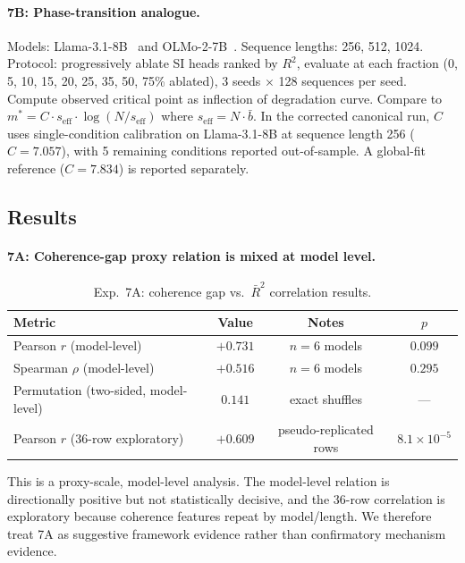 \documentclass{article}
\begin{document}
\paragraph{7B: Phase-transition analogue.} Models: Llama-3.1-8B~\citep{dubey2024llama3}
and OLMo-2-7B~\citep{groeneveld2024olmo}. Sequence lengths: 256, 512, 1024. Protocol:
progressively ablate SI heads ranked by $R^2$, evaluate at each fraction
(0, 5, 10, 15, 20, 25, 35, 50, 75\% ablated), 3 seeds $\times$ 128 sequences per seed.
Compute observed critical point as inflection of degradation curve. Compare to
$m^* = C \cdot s_{\text{eff}} \cdot \log(N / s_{\text{eff}})$ where $s_{\text{eff}} = N \cdot \bar{b}$.
In the corrected canonical run, $C$ uses single-condition calibration on
Llama-3.1-8B at sequence length 256 ($C=7.057$), with 5 remaining conditions
reported out-of-sample. A global-fit reference ($C=7.834$) is reported separately.

\subsection{Results}

\paragraph{7A: Coherence-gap proxy relation is mixed at model level.}

\begin{table}[htbp]
    \caption{Exp.~7A: coherence gap vs.\ $\bar{R}^2$ correlation results.}
    \centering
    \small
    \begin{tabular}{lccc}
        \toprule
        Metric & Value & Notes & $p$ \\
        \midrule
        Pearson $r$ (model-level) & $+0.731$ & $n=6$ models & $0.099$ \\
        Spearman $\rho$ (model-level) & $+0.516$ & $n=6$ models & $0.295$ \\
        Permutation (two-sided, model-level) & $0.141$ & exact shuffles & --- \\
        Pearson $r$ (36-row exploratory) & $+0.609$ & pseudo-replicated rows & $8.1\times10^{-5}$ \\
        \bottomrule
    \end{tabular}
\end{table}

This is a proxy-scale, model-level analysis. The model-level relation is directionally
positive but not statistically decisive, and the 36-row correlation is exploratory because
coherence features repeat by model/length. We therefore treat 7A as suggestive
framework evidence rather than confirmatory mechanism evidence.
\end{document}
